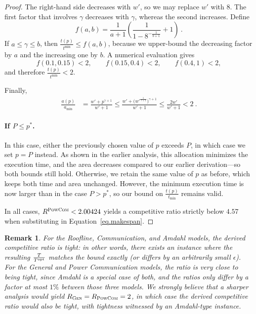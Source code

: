 \documentclass{article}
\newtheorem{remark}{Remark}
\newcommand\opt{\textnormal{opt}\xspace}
\newcommand\GEN{\textsc{Gen}\xspace}
\newcommand\PCOM{\textsc{PowCom}\xspace}
\begin{document}
\begin{proof}
The right-hand side decreases with \(w'\), so we may replace \(w'\) with \(8\).  
The first factor that involves \(\gamma\) decreases with \(\gamma\), whereas the second increases.  
Define
\[
f(a,b)=\frac{1}{a+1}
        \left(
          \frac{1}{1-8^{-\frac{1}{b+1}}}+1
        \right)\ .
\]
If \(a \le \gamma \le b\), then \(\tfrac{t(p)}{t^{\min}} \le f(a,b)\), because we upper-bound the decreasing factor by \(a\) and the increasing one by \(b\).  
A numerical evaluation gives
\[
f(0.1,0.15) < 2,\qquad
f(0.15,0.4) < 2,\qquad
f(0.4,1)   < 2,
\]
and therefore \(\frac{t(p)}{t^{\min}} < 2.\)

\medskip
\noindent
Finally,
\begin{align*}
\frac{a(p)}{a_{\min}}
   &= \frac{w'+p^{\gamma+1}}{w'+1} \le \frac{w'+\bigl(w'^{\frac{1}{\gamma+1}}\bigr)^{\gamma+1}}{w'+1}
   \le \frac{2w'}{w'+1} < 2 \ .
\end{align*}

\paragraph{If \( P \leq p^* \).}

In this case, either the previously chosen value of \( p \) exceeds \( P \), in which case we set \( p = P \) instead. As shown in the earlier analysis, this allocation minimizes the execution time, and the area decreases compared to our earlier derivation—so both bounds still hold. Otherwise, we retain the same value of \( p \) as before, which keeps both time and area unchanged. However, the minimum execution time is now larger than in the case \( P > p^* \), so our bound on \( \frac{t(p)}{t_{\min}} \) remains valid.

\smallskip
\noindent
In all cases, \(R^{\PCOM}<2.00424\) yields a competitive ratio strictly below \(4.57\) when substituting in Equation~\ref{eq.makespan}.


\end{proof}
\begin{remark}
For the Roofline, Communication, and Amdahl models, the derived competitive ratio is tight: in other words, there exists an instance where the resulting $\frac{T}{T^{\opt}}$ matches the bound exactly (or differs by an arbitrarily small $\epsilon$). For the General and Power Communication models, the ratio is very close to being tight, since Amdahl is a special case of both, and the ratios only differ by a factor at most $1\%$ between those three models. We strongly believe that a sharper analysis would yield $R_{\GEN} = R_{\PCOM} = 2$, in which case the derived competitive ratio would also be tight, with tightness witnessed by an Amdahl-type instance.
\end{remark}
\end{document}
